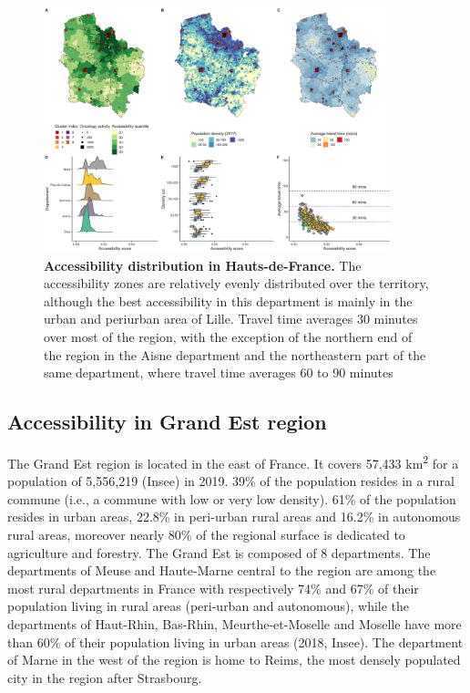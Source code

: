 \begin{figure}[h!]
    \includegraphics[width=0.9\textwidth]{images/camion/region_accessibility/accessibility_Hauts-de-France.png}
    \centering
    \caption{ \textbf{Accessibility distribution in Hauts-de-France.} The
        accessibility zones are relatively evenly distributed over the
        territory, although the best accessibility in this department is mainly
        in the urban and periurban area of Lille. Travel time averages 30
        minutes over most of the region, with the exception of the northern end
        of the region in the Aisne department and the northeastern part of the
        same department, where travel time averages 60 to 90 minutes }
\end{figure}

\subsection*{Accessibility in Grand Est region}

The Grand Est region is located in the east of France. It covers 57,433
km\textsuperscript{2} for a population of 5,556,219 (Insee) in 2019. 39\% of the
population resides in a rural commune (i.e., a commune with low or very low
density). 61\% of the population resides in urban areas, 22.8\% in peri-urban
rural areas and 16.2\% in autonomous rural areas, moreover nearly 80\% of the
regional surface is dedicated to agriculture and forestry. The Grand Est is
composed of 8 departments. The departments of Meuse and Haute-Marne central to
the region are among the most rural departments in France with respectively 74\%
and 67\% of their population living in rural areas (peri-urban and autonomous),
while the departments of Haut-Rhin, Bas-Rhin, Meurthe-et-Moselle and Moselle
have more than 60\% of their population living in urban areas (2018, Insee). The
department of Marne in the west of the region is home to Reims, the most densely
populated city in the region after Strasbourg.

